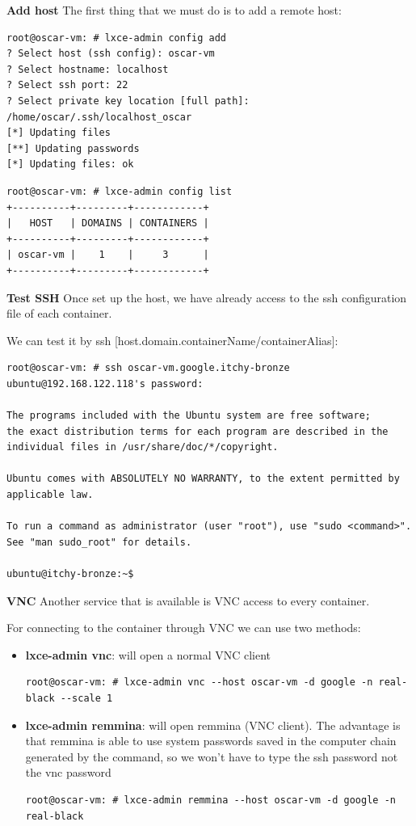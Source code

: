 \textbf{Add host}
The first thing that we must do is to add a remote host:
\begin{verbatim}
root@oscar-vm: # lxce-admin config add
? Select host (ssh config): oscar-vm
? Select hostname: localhost
? Select ssh port: 22
? Select private key location [full path]: /home/oscar/.ssh/localhost_oscar
[*] Updating files
[**] Updating passwords
[*] Updating files: ok
\end{verbatim}

\begin{verbatim}
root@oscar-vm: # lxce-admin config list
+----------+---------+------------+
|   HOST   | DOMAINS | CONTAINERS |
+----------+---------+------------+
| oscar-vm |    1    |     3      |
+----------+---------+------------+
\end{verbatim}

\newpage
\textbf{Test SSH}
Once set up the host, we have already access to the ssh configuration file of each container.

We can test it by ssh [host.domain.containerName/containerAlias]:
\begin{verbatim}
root@oscar-vm: # ssh oscar-vm.google.itchy-bronze
ubuntu@192.168.122.118's password:

The programs included with the Ubuntu system are free software;
the exact distribution terms for each program are described in the
individual files in /usr/share/doc/*/copyright.

Ubuntu comes with ABSOLUTELY NO WARRANTY, to the extent permitted by
applicable law.

To run a command as administrator (user "root"), use "sudo <command>".
See "man sudo_root" for details.

ubuntu@itchy-bronze:~$
\end{verbatim}

\textbf{VNC}
Another service that is available is VNC access to every container.

For connecting to the container through VNC we can use two methods:
\begin{itemize}
	\item{\textbf{lxce-admin vnc}: will open a normal VNC client}
\begin{verbatim}
root@oscar-vm: # lxce-admin vnc --host oscar-vm -d google -n real-black --scale 1
\end{verbatim}
	\item{\textbf{lxce-admin remmina}: will open remmina (VNC client). The advantage is that remmina is able to use system passwords saved in the computer chain generated by the command, so we won't have to type the ssh password not the vnc password}
\begin{verbatim}
root@oscar-vm: # lxce-admin remmina --host oscar-vm -d google -n real-black
\end{verbatim}
\end{itemize}

